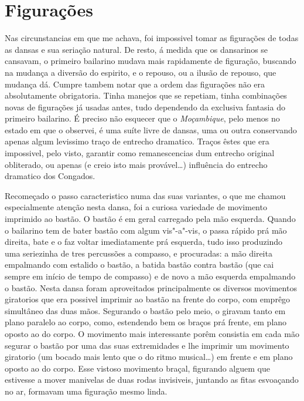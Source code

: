 \section{Figurações}

Nas circunstancias em que me achava, foi impossivel tomar as figurações
de todas as dansas e sua seriação natural. De resto, á medida que os
dansarinos se cansavam, o primeiro bailarino mudava mais rapidamente de
figuração, buscando na mudança a diversão do espirito, e o repouso, ou a
ilusão de repouso, que mudança dá. Cumpre tambem notar que a ordem das
figurações não era absolutamente obrigatoria. Tinha manejos que se
repetiam, tinha combinações novas de figurações já usadas antes, tudo
dependendo da exclusiva fantasia do primeiro bailarino. É preciso não
esquecer que o \emph{Moçambique}, pelo menos no estado em que o
observei, é uma suíte livre de dansas, uma ou outra conservando apenas
algum levissimo traço de entrecho dramatico. Traços êstes que era
impossivel, pelo visto, garantir como remanescencias dum entrecho
original obliterado, ou apenas (e creio isto mais provável\ldots{})
influência do entrecho dramatico dos Congados.

Recomeçado o passo caracteristico numa das suas variantes, o que me
chamou especialmente atenção nesta dansa, foi a curiosa variedade de
movimento imprimido ao bastão. O bastão é em geral carregado pela mão
esquerda. Quando o bailarino tem de bater bastão com algum vis"-a"-vis, o
passa rápido prá mão direita, bate e o faz voltar imediatamente prá
esquerda, tudo isso produzindo uma seriezinha de tres percussões a
compasso, e procuradas: a mão direita empalmando com estalido o bastão,
a batida bastão contra bastão (que cai sempre em início de tempo de
compasso) e de novo a mão esquerda empalmando o bastão. Nesta dansa
foram aproveitados principalmente os diversos movimentos giratorios que
era possivel imprimir ao bastão na frente do corpo, com emprêgo
simultâneo das duas mãos. Segurando o bastão pelo meio, o giravam tanto
em plano paralelo ao corpo, como, estendendo bem os braços prá frente,
em plano oposto ao do corpo. O movimento mais interessante porêm
consistia em cada mão segurar o bastão por uma das suas extremidades e
lhe imprimir um movimento giratorio (um bocado mais lento que o do ritmo
musical\ldots{}) em frente e em plano oposto ao do corpo. Esse vistoso
movimento braçal, figurando alguem que estivesse a mover manivelas de
duas rodas invisiveis, juntando as fitas esvoaçando no ar, formavam uma
figuração mesmo linda.

\pagebreak


